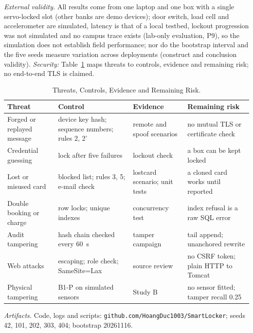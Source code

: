 \documentclass[journal,onecolumn]{IEEEtran}
\begin{document}
\textit{External validity.} All results come from one laptop and one box with a single servo-locked slot (other
banks are demo devices); door switch, load cell and accelerometer are simulated, latency is that of a local testbed,
lockout progression was not simulated and no campus trace exists (lab-only evaluation, P9), so the simulation does
not establish field performance; nor do the bootstrap interval and the five seeds measure variation across deployments
(construct and conclusion validity). \textit{Security:} Table~\ref{tab:threats} maps threats to controls, evidence and
remaining risk; no end-to-end TLS is claimed.

\begin{table}[!htbp]
\renewcommand{\arraystretch}{1.02}
\centering
\footnotesize
\caption{Threats, Controls, Evidence and Remaining Risk.}
\label{tab:threats}
\vspace{2pt}
\begin{tabular}{>{\raggedright\arraybackslash}p{3.3cm} >{\raggedright\arraybackslash}p{4.6cm} >{\raggedright\arraybackslash}p{3.5cm} >{\raggedright\arraybackslash}p{4.8cm}}
\hline
Threat & Control & Evidence & Remaining risk \\
\hline
\rule{0pt}{2.4ex}Forged or replayed message & device key hash; sequence numbers; rules 2, 2' & remote and spoof scenarios & no mutual TLS or certificate check \\
Credential guessing & lock after five failures & lockout check & a box can be kept locked \\
Lost or misused card & blocked list; rules 3, 5; e-mail check & lostcard scenario; unit tests & a cloned card works until reported \\
Double booking or charge & row locks; unique indexes & concurrency test & index refusal is a raw SQL error \\
Audit tampering & hash chain checked every 60~s & tamper campaign & tail append; unanchored rewrite \\
Web attacks & escaping; role check; SameSite=Lax & source review & no CSRF token; plain HTTP to Tomcat \\
Physical tampering & B1-P on simulated sensors & Study B & no sensor fitted; tamper recall 0.25 \\
\hline
\end{tabular}
\end{table}

\textit{Artifacts.} Code, logs and scripts: \texttt{github.com/HoangDuc1003/SmartLocker}; seeds 42, 101, 202, 303, 404; bootstrap 20261116.
\end{document}
